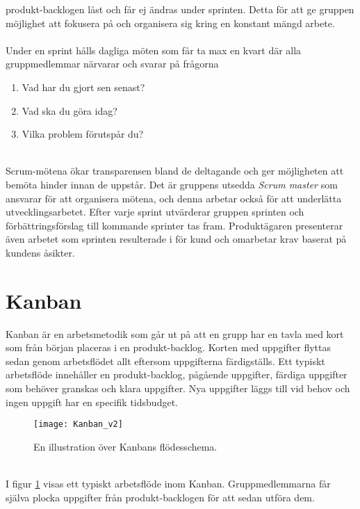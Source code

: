 produkt-backlogen låst och får ej ändras under sprinten. Detta för att ge
gruppen möjlighet att fokusera på och organisera sig kring en konstant mängd arbete.
\\ \\
Under en sprint hålls dagliga möten som får ta max en kvart där alla gruppmedlemmar
närvarar och svarar på frågorna
\begin{enumerate}
\item Vad har du gjort sen senast?
\item Vad ska du göra idag?
\item Vilka problem förutspår du?
\end{enumerate}
\ \\
Scrum-mötena ökar transparensen bland de deltagande och ger möjligheten att bemöta hinder
innan de uppstår. Det är gruppens utsedda \textit{Scrum master} som ansvarar för
att organisera mötena, och denna arbetar också för att underlätta utvecklingsarbetet.
Efter varje sprint utvärderar gruppen sprinten och förbättringsförslag till kommande sprinter tas fram.
Produktägaren presenterar även arbetet som sprinten resulterade i för kund och omarbetar krav baserat
på kundens åsikter.

\section{Kanban}
\label{sec:kanban}
Kanban är en arbetsmetodik som går ut på att en grupp har en tavla med kort som från början placeras i en produkt-backlog. 
\cite{website:atlassian_kanban} Korten med uppgifter flyttas sedan genom arbetsflödet allt eftersom uppgifterna färdigställs. 
Ett typiskt arbetsflöde innehåller en produkt-backlog, pågående uppgifter, färdiga uppgifter som behöver granskas och klara uppgifter. Nya uppgifter läggs till vid behov och ingen uppgift har en specifik tidsbudget.

\begin{figure}[H]
  \centering
  \texttt{[image: Kanban\_v2]}
  \caption{En illustration över Kanbans flödesschema.}
  \label{fig:kanban_workflow}
\end{figure}
\ \\
I figur \ref{fig:kanban_workflow} visas ett typiskt arbetsflöde inom Kanban. Gruppmedlemmarna får själva plocka uppgifter från produkt-backlogen för att sedan utföra dem.

